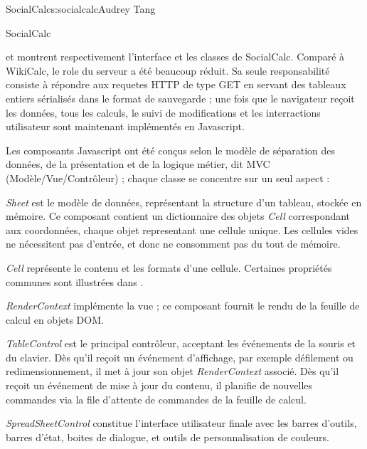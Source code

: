 \begin{aosachapter}{SocialCalc}{s:socialcalc}{Audrey Tang}
\begin{aosasect1}{SocialCalc}

 et  montrent respectivement l'interface et les classes de SocialCalc. Comparé à WikiCalc, le role du serveur a été beaucoup réduit. Sa seule responsabilité consiste à répondre aux requetes HTTP de type GET en servant des tableaux entiers sérialisés dans le format de sauvegarde ; une fois que le navigateur reçoit les données, tous les calculs, le suivi de modifications et les interractions utilisateur sont maintenant implémentés en Javascript.


Les composants Javascript ont été conçus selon le modèle de séparation des données, de la présentation et de la logique métier, dit MVC (Modèle/Vue/Contrôleur) ; chaque classe se concentre sur un seul aspect :

\begin{aosadescription}

  \item{\emph{Sheet}} est le modèle de données, représentant la structure d'un tableau, stockée en mémoire.  Ce composant contient un dictionnaire des objets \emph{Cell} correspondant aux coordonnées, chaque objet representant une cellule unique.  Les cellules vides ne nécessitent pas d'entrée, et donc ne consomment pas du tout de mémoire.

  \item{\emph{Cell}} représente le contenu et les formats d'une cellule.  Certaines propriétés communes sont illustrées dans .

  \item{\emph{RenderContext}} implémente la vue ; ce composant fournit le rendu de la feuille de calcul en objets DOM.

  \item{\emph{TableControl}} est le principal contrôleur, acceptant les événements de la souris et du clavier.  Dès qu'il reçoit un événement d'affichage, par exemple défilement ou redimensionnement, il met à jour son objet \emph{RenderContext} associé.  Dès qu'il reçoit un événement de mise à jour du contenu, il planifie de nouvelles commandes via la file d'attente de commandes de la feuille de calcul.

  \item{\emph{SpreadSheetControl}} constitue l'interface utilisateur finale avec les barres d'outils, barres d'état, boites de dialogue, et outils de personnalisation de couleurs.


\end{aosadescription}
\end{aosasect1}
\end{aosachapter}
